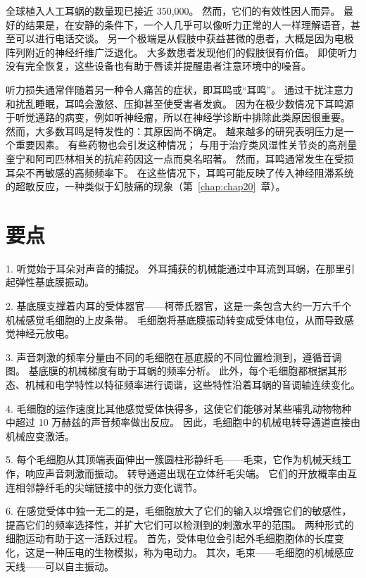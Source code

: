全球植入人工耳蜗的数量现已接近 350,000。
然而，它们的有效性因人而异。
最好的结果是，在安静的条件下，一个人几乎可以像听力正常的人一样理解语音，甚至可以进行电话交谈。
另一个极端是从假肢中获益甚微的患者，大概是因为电极阵列附近的神经纤维广泛退化。
大多数患者发现他们的假肢很有价值。
即使听力没有完全恢复，这些设备也有助于唇读并提醒患者注意环境中的噪音。


听力损失通常伴随着另一种令人痛苦的症状，即耳鸣或“耳鸣”。
通过干扰注意力和扰乱睡眠，耳鸣会激怒、压抑甚至使受害者发疯。
因为在极少数情况下耳鸣源于听觉通路的病变，例如听神经瘤，所以在神经学诊断中排除此类原因很重要。
然而，大多数耳鸣是特发性的：其原因尚不确定。
越来越多的研究表明压力是一个重要因素。
有些药物也会引发这种情况；
与用于治疗类风湿性关节炎的高剂量奎宁和阿司匹林相关的抗疟药因这一点而臭名昭著。
然而，耳鸣通常发生在受损耳朵不再敏感的高频频率下。
在这些情况下，耳鸣可能反映了传入神经阻滞系统的超敏反应，一种类似于幻肢痛的现象（第~\ref{chap:chap20}~章）。



\section{要点}

1. 听觉始于耳朵对声音的捕捉。
外耳捕获的机械能通过中耳流到耳蜗，在那里引起弹性基底膜振动。


2. 基底膜支撑着内耳的受体器官——柯蒂氏器官，这是一条包含大约一万六千个机械感觉毛细胞的上皮条带。
毛细胞将基底膜振动转变成受体电位，从而导致感觉神经元放电。


3. 声音刺激的频率分量由不同的毛细胞在基底膜的不同位置检测到，遵循音调图。
基底膜的机械梯度有助于耳蜗的频率分析。
此外，每个毛细胞都根据其形态、机械和电学特性以特征频率进行调谐，这些特性沿着耳蜗的音调轴连续变化。 


4. 毛细胞的运作速度比其他感觉受体快得多，这使它们能够对某些哺乳动物物种中超过 10 万赫兹的声音频率做出反应。
因此，毛细胞中的机械电转导通道直接由机械应变激活。 


5. 每个毛细胞从其顶端表面伸出一簇圆柱形静纤毛——毛束，它作为机械天线工作，响应声音刺激而振动。
转导通道出现在立体纤毛尖端。
它们的开放概率由互连相邻静纤毛的尖端链接中的张力变化调节。


6. 在感觉受体中独一无二的是，毛细胞放大了它们的输入以增强它们的敏感性，提高它们的频率选择性，并扩大它们可以检测到的刺激水平的范围。
两种形式的细胞运动有助于这一活跃过程。
首先，受体电位会引起外毛细胞胞体的长度变化，这是一种压电的生物模拟，称为电动力。
其次，毛束——毛细胞的机械感应天线——可以自主振动。 


